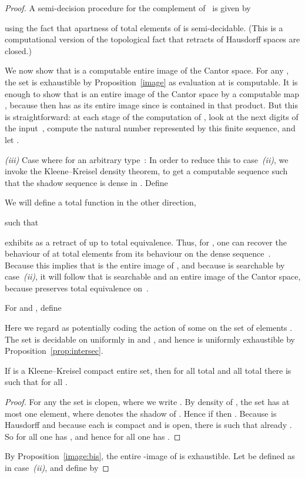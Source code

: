 \documentclass{LMCS}
\begin{document}
\begin{proof}
\medskip

A semi-decision procedure for the complement of~ is given by

using the fact that apartness of total elements of  is
semi-decidable.
(This is a computational version of the topological fact
that retracts of Hausdorff spaces are closed.) 

\medskip

We now show that  is a computable entire image of the Cantor space.
For any , the set  is
exhaustible by Proposition~\ref{image} as evaluation at  is
computable. It is enough to show that  is an entire image of the
Cantor space by a computable map , because then  has  as its entire image
since  is contained in that product. But this is straightforward:
at each stage  of the computation of , look at the next
 digits of the input~,
compute the natural
number  represented by this finite sequence, and let
.

\medskip

\pagebreak[3] \emph{(iii)} Case  where
 for an arbitrary type~: In order to reduce this
to case~\emph{(ii)}, we invoke the Kleene--Kreisel density
theorem, to get a computable sequence  such that the shadow
sequence  is dense in .  Define


We will define a total function  in the other direction,

such that

exhibits  as a retract of  up to total equivalence.
Thus, for , one can recover the behaviour of 
at total elements from its behaviour on the dense sequence~.
Because this implies that  is the entire image of , and
because  is searchable by case~\emph{(ii)}, it will follow that
 is searchable and an entire image of the Cantor space, because 
preserves total equivalence on~.

For  and , define

Here we regard  as potentially coding the action of some 
on the set of elements .  The set  is decidable on
 uniformly in  and , and hence  is uniformly
exhaustible by Proposition~\ref{prop:intersec}.  \pagebreak[3]
\begin{lem} \label{c} If  is a
  Kleene--Kreisel compact entire set, then for all total  and all total  there is  such that  for all .
\end{lem}
\begin{proof}
  For any  the set  is clopen, where we
  write . By density of , the set  has at most one element, where  denotes
  the shadow of . Hence if 
  then .  Because
   is Hausdorff and because each 
  is compact and  is open, there is  such that already
  . So for all 
  one has , and hence for all  one has .
\end{proof}
By Proposition~\ref{image:bis}, the entire -image  of  is exhaustible.  Let 
be defined as in case~\emph{(ii)}, and define  by


\end{proof}
\end{document}
